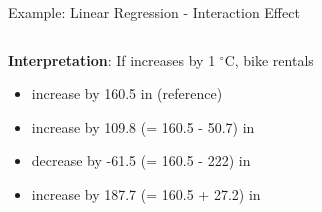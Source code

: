 \documentclass[11pt,compress,t,notes=noshow, aspectratio=169, xcolor=table]{beamer}
\begin{document}
\begin{frame}{Example: Linear Regression - Interaction Effect}
\begin{columns}[T, totalwidth=\linewidth]
\end{columns}
\vfill
\pause
\begin{columns}[T, totalwidth=\linewidth]
\begin{column}{0.6\linewidth}
\textbf{Interpretation}: If  increases by 1 $^{\circ}$C, bike rentals
\begin{itemize}[<+->]
    \item increase by 160.5 in  (reference)
    \item increase by 109.8 (= 160.5 - 50.7) in 
    \item decrease by -61.5 (= 160.5 - 222) in 
    \item increase by 187.7 (= 160.5 + 27.2) in 
\end{itemize} %
\end{column}
\begin{column}{0.4\linewidth}
\end{column}
\end{columns}
\end{frame}
\end{document}
